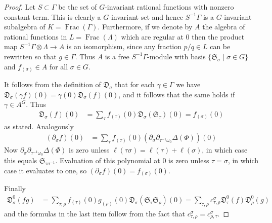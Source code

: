 \documentclass[11pt,fleqn]{article}
\newcommand\D{\mathfrak D}
\newcommand\ot{\otimes}
\renewcommand\to{\longrightarrow}
\renewcommand\SS{\mathfrak S}
\DeclareMathOperator\Frac{Frac}
\begin{document}
\begin{proof}
Let $S \subset \Gamma$ be the set of $G$-invariant rational functions with 
nonzero constant term. This is clearly a $G$-invariant set and hence 
$S^{-1} \Gamma$ is a $G$-invariant subalgebra of $K = \Frac(\Gamma)$. 
Furthermore, if we denote by $A$ the algebra of rational functions in $L =
\Frac(\Lambda)$ which are regular at $0$ then the product map $S^{-1} \Gamma 
\ot \Lambda \to A$ is an isomorphism, since any fraction $p/q \in L$ can be
rewritten so that $g \in \Gamma$. Thus $A$ is a free $S^{-1}\Gamma$-module with
basis $\{\SS_\sigma \mid \sigma \in G\}$ and $f_{(\sigma)} \in A$ for all
$\sigma \in G$. 

It follows from the definition of $\D_\sigma$ that for each $\gamma \in 
\Gamma$ we have $\D_\sigma(\gamma f)(0) = \gamma(0) \D_\sigma(f)(0)$, and it
follows that the same holds if $\gamma \in A^G$. Thus
\begin{align*}
\D_\sigma(f)(0)
	&= \sum_{\tau} f_{(\tau)}(0) \D_\sigma(\SS_\tau)(0)
	= f_{(\sigma)}(0)
\end{align*}
as stated. Analogously 
\begin{align*}
(\partial_{\sigma} f)(0)
	&= \sum_{\tau} f_{(\tau)}(0) (\partial_{\sigma} 
		\partial_{\tau^{-1}\omega_0} \Delta(\Phi))(0)
\end{align*}
Now $\partial_{\sigma} \partial_{\tau^{-1}\omega_0} \Delta(\Phi)$ is 
zero unless $\ell(\tau \sigma) = \ell(\tau) + \ell(\sigma)$, in which case this
equals $\SS_{\tau\sigma^{-1}}$. Evaluation of this polynomial at $0$ is zero 
unless $\tau = \sigma$, in which case it evaluates to one, so 
$(\partial_{\sigma} f)(0) = f_{(\sigma)}(0)$.

Finally
\begin{align*}
\D_\sigma^0(fg)
	&= \sum_{\tau, \rho} f_{(\tau)}(0) g_{(\rho)}(0) 
		\D_\sigma(\SS_\tau \SS_\rho)(0) 
	= \sum_{\tau, \rho} c_{\tau, \rho}^\sigma \D_{\tau}^0(f) 
	\D_{\rho}^0(g)
\end{align*}
and the formulas in the last item follow from the fact that 
$c^\sigma_{\tau, \rho} = c^\sigma_{\rho, \tau}$.
\end{proof}
\end{document}
